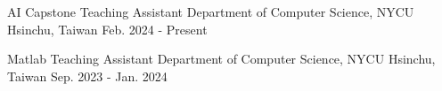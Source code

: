 

\begin{cventries}

  \cventry
    {AI Capstone Teaching Assistant} %
    {Department of Computer Science, NYCU} %
    {Hsinchu, Taiwan} %
    {Feb. 2024 - Present} %
    {}

  \cventry
    {Matlab Teaching Assistant} %
    {Department of Computer Science, NYCU} %
    {Hsinchu, Taiwan} %
    {Sep. 2023 - Jan. 2024} %
    {}

\end{cventries}
